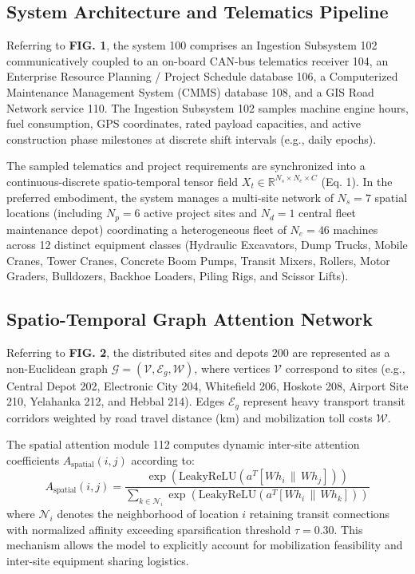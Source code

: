 \documentclass[11pt,a4paper]{article}
\begin{document}
\subsection{System Architecture and Telematics Pipeline}
\noindent Referring to \textbf{FIG. 1}, the system 100 comprises an Ingestion Subsystem 102 communicatively coupled to an on-board CAN-bus telematics receiver 104, an Enterprise Resource Planning / Project Schedule database 106, a Computerized Maintenance Management System (CMMS) database 108, and a GIS Road Network service 110. The Ingestion Subsystem 102 samples machine engine hours, fuel consumption, GPS coordinates, rated payload capacities, and active construction phase milestones at discrete shift intervals (e.g., daily epochs).

\noindent The sampled telematics and project requirements are synchronized into a continuous-discrete spatio-temporal tensor field $X_t \in \mathbb{R}^{N_s \times N_e \times C}$ (Eq. 1). In the preferred embodiment, the system manages a multi-site network of $N_s = 7$ spatial locations (including $N_p = 6$ active project sites and $N_d = 1$ central fleet maintenance depot) coordinating a heterogeneous fleet of $N_e = 46$ machines across 12 distinct equipment classes (Hydraulic Excavators, Dump Trucks, Mobile Cranes, Tower Cranes, Concrete Boom Pumps, Transit Mixers, Rollers, Motor Graders, Bulldozers, Backhoe Loaders, Piling Rigs, and Scissor Lifts).

\subsection{Spatio-Temporal Graph Attention Network}
\noindent Referring to \textbf{FIG. 2}, the distributed sites and depots 200 are represented as a non-Euclidean graph $\mathcal{G} = (\mathcal{V}, \mathcal{E}_g, \mathcal{W})$, where vertices $\mathcal{V}$ correspond to sites (e.g., Central Depot 202, Electronic City 204, Whitefield 206, Hoskote 208, Airport Site 210, Yelahanka 212, and Hebbal 214). Edges $\mathcal{E}_g$ represent heavy transport transit corridors weighted by road travel distance (km) and mobilization toll costs $\mathcal{W}$.

\noindent The spatial attention module 112 computes dynamic inter-site attention coefficients $A_{\text{spatial}}(i, j)$ according to:
\begin{equation}
A_{\text{spatial}}(i, j) = \frac{\exp\left(\text{LeakyReLU}\left(a^T [W h_i \,\|\, W h_j]\right)\right)}{\sum_{k \in \mathcal{N}_i} \exp\left(\text{LeakyReLU}\left(a^T [W h_i \,\|\, W h_k]\right)\right)} \label{eq:gat_spec}
\end{equation}
where $\mathcal{N}_i$ denotes the neighborhood of location $i$ retaining transit connections with normalized affinity exceeding sparsification threshold $\tau = 0.30$. This mechanism allows the model to explicitly account for mobilization feasibility and inter-site equipment sharing logistics.
\end{document}
